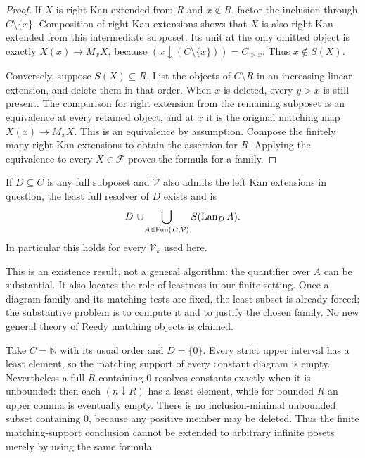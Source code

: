 \begin{proof}
If $X$ is right Kan extended from $R$ and $x\notin R$, factor the
inclusion through $C\setminus\{x\}$. Composition of right Kan
extensions shows that $X$ is also right Kan extended from this
intermediate subposet. Its unit at the only omitted object is exactly
$X(x)\to M_xX$, because
$(x\downarrow(C\setminus\{x\}))=C_{>x}$. Thus $x\notin S(X)$.

Conversely, suppose $S(X)\subseteq R$. List the objects of
$C\setminus R$ in an increasing linear extension, and delete them in
that order. When $x$ is deleted, every $y>x$ is still present. The
comparison for right extension from the remaining subposet is an
equivalence at every retained object, and at $x$ it is the original
matching map $X(x)\to M_xX$. This is an equivalence by assumption.
Compose the finitely many right Kan extensions to obtain the assertion
for $R$. Applying the equivalence to every $X\in\mathcal F$ proves
the formula for a family.
\end{proof}

\begin{corollary}\label{cor:arbitraryD}
If $D\subseteq C$ is any full subposet and $\mathcal V$ also admits
the left Kan extensions in question, the least full resolver of $D$
exists and is
\begin{equation}\label{eq:arbitraryD}
D\,\cup\!\bigcup_{A\in\operatorname{Fun}(D,\mathcal V)}S(\operatorname{Lan}_D A).
\end{equation}
In particular this holds for every $\mathcal V_k$ used here.
\end{corollary}

This is an existence result, not a general algorithm: the quantifier
over $A$ can be substantial. It also locates the role of leastness in
our finite setting. Once a diagram family and its matching tests are
fixed, the least subset is already forced; the substantive problem is
to compute it and to justify the chosen family. No new general theory
of Reedy matching objects is claimed.

\begin{example}\label{ex:infinite}
Take $C=\mathbb N$ with its usual order and $D=\{0\}$.
Every strict upper interval has a least element, so the matching support
of every constant diagram is empty. Nevertheless a full $R$ containing
$0$ resolves constants exactly when it is unbounded: then each
$(n\downarrow R)$ has a least element, while for bounded $R$ an upper
comma is eventually empty. There is no inclusion-minimal unbounded
subset containing $0$, because any positive member may be deleted.
Thus the finite matching-support conclusion cannot be extended to
arbitrary infinite posets merely by using the same formula.
\end{example}

